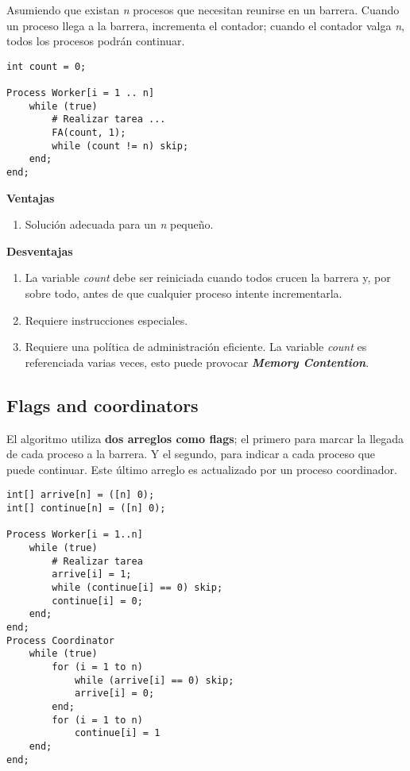 \documentclass[a4paper, 10pt]{report}
\begin{document}
Asumiendo que existan \emph{n} procesos que necesitan reunirse en un barrera. Cuando un proceso llega a la barrera, incrementa el contador; cuando el contador valga \emph{n}, todos los procesos podrán continuar.

\begin{lstlisting}
int count = 0;

Process Worker[i = 1 .. n]
    while (true)
        # Realizar tarea ...
        FA(count, 1);
        while (count != n) skip;
    end;
end;
\end{lstlisting}

\textbf{Ventajas}
\begin{enumerate}
    \item Solución adecuada para un \emph{n} pequeño.
\end{enumerate}

\textbf{Desventajas}
\begin{enumerate}
    \item La variable \emph{count} debe ser reiniciada cuando todos crucen la barrera y, por sobre todo, antes de que cualquier proceso intente incrementarla.
    \item Requiere instrucciones especiales.
    \item Requiere una política de administración eficiente. La variable \emph{count} es referenciada varias veces, esto puede provocar \textbf{\emph{Memory Contention}}.
\end{enumerate}

\subsection{Flags and coordinators}

El algoritmo utiliza \textbf{dos arreglos como flags}; el primero para marcar la llegada de cada proceso a la barrera. Y el segundo, para indicar a cada proceso que puede continuar. Este último arreglo es actualizado por un proceso coordinador.

\begin{lstlisting}[multicols=2]
int[] arrive[n] = ([n] 0);
int[] continue[n] = ([n] 0);

Process Worker[i = 1..n]
    while (true)
        # Realizar tarea
        arrive[i] = 1;
        while (continue[i] == 0) skip;
        continue[i] = 0;
    end;
end;
Process Coordinator
    while (true)
        for (i = 1 to n)
            while (arrive[i] == 0) skip;
            arrive[i] = 0;
        end;
        for (i = 1 to n)
            continue[i] = 1
    end;
end;
\end{lstlisting}
\end{document}
